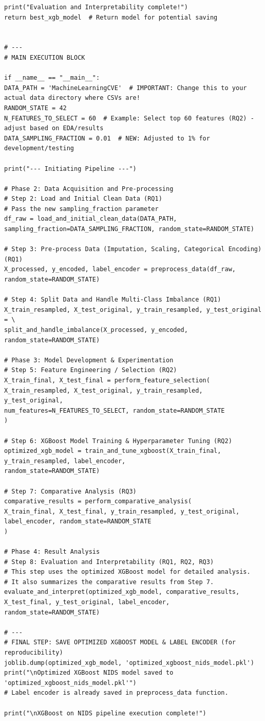 \begin{lstlisting}[caption={Complete pipeline of XGBoost using CIC-IDS2017 in NIDS using Python}, label={lst:python-pipeline}]
print("Evaluation and Interpretability complete!")
return best_xgb_model  # Return model for potential saving


# ---
# MAIN EXECUTION BLOCK

if __name__ == "__main__":
DATA_PATH = 'MachineLearningCVE'  # IMPORTANT: Change this to your actual data directory where CSVs are!
RANDOM_STATE = 42
N_FEATURES_TO_SELECT = 60  # Example: Select top 60 features (RQ2) - adjust based on EDA/results
DATA_SAMPLING_FRACTION = 0.01  # NEW: Adjusted to 1% for development/testing

print("--- Initiating Pipeline ---")

# Phase 2: Data Acquisition and Pre-processing
# Step 2: Load and Initial Clean Data (RQ1)
# Pass the new sampling_fraction parameter
df_raw = load_and_initial_clean_data(DATA_PATH, sampling_fraction=DATA_SAMPLING_FRACTION, random_state=RANDOM_STATE)

# Step 3: Pre-process Data (Imputation, Scaling, Categorical Encoding) (RQ1)
X_processed, y_encoded, label_encoder = preprocess_data(df_raw, random_state=RANDOM_STATE)

# Step 4: Split Data and Handle Multi-Class Imbalance (RQ1)
X_train_resampled, X_test_original, y_train_resampled, y_test_original = \
split_and_handle_imbalance(X_processed, y_encoded, random_state=RANDOM_STATE)

# Phase 3: Model Development & Experimentation
# Step 5: Feature Engineering / Selection (RQ2)
X_train_final, X_test_final = perform_feature_selection(
X_train_resampled, X_test_original, y_train_resampled, y_test_original,
num_features=N_FEATURES_TO_SELECT, random_state=RANDOM_STATE
)

# Step 6: XGBoost Model Training & Hyperparameter Tuning (RQ2)
optimized_xgb_model = train_and_tune_xgboost(X_train_final, y_train_resampled, label_encoder,
random_state=RANDOM_STATE)

# Step 7: Comparative Analysis (RQ3)
comparative_results = perform_comparative_analysis(
X_train_final, X_test_final, y_train_resampled, y_test_original, label_encoder, random_state=RANDOM_STATE
)

# Phase 4: Result Analysis
# Step 8: Evaluation and Interpretability (RQ1, RQ2, RQ3)
# This step uses the optimized XGBoost model for detailed analysis.
# It also summarizes the comparative results from Step 7.
evaluate_and_interpret(optimized_xgb_model, comparative_results, X_test_final, y_test_original, label_encoder,
random_state=RANDOM_STATE)

# ---
# FINAL STEP: SAVE OPTIMIZED XGBOOST MODEL & LABEL ENCODER (for reproducibility)
joblib.dump(optimized_xgb_model, 'optimized_xgboost_nids_model.pkl')
print("\nOptimized XGBoost NIDS model saved to 'optimized_xgboost_nids_model.pkl'")
# Label encoder is already saved in preprocess_data function.

print("\nXGBoost on NIDS pipeline execution complete!")

\end{lstlisting}
